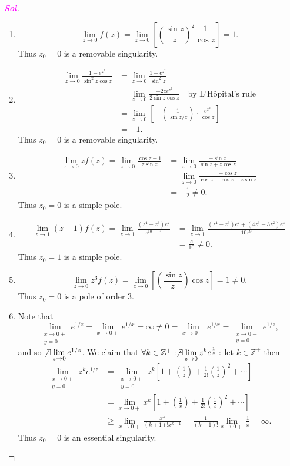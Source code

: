 \documentclass{article}
\theoremstyle{definition}
\newcommand{\Z}{\mathbb{Z}}
\newcommand{\of}[1]{\left( #1 \right)}
\newcommand{\sol}{\textcolor{magenta}{\bf Sol}}
\begin{document}
\begin{proof}[\sol]
	\begin{enumerate}[(1)]
		\item \[
		\lim\limits_{z\to 0}f(z)=\lim\limits_{z\to 0}\left[\of{\frac{\sin z}{z}}^2\frac{1}{\cos z}\right]=1.
		\] Thus $z_0=0$ is a removable singularity.
		\item \begin{align*}
			\lim\limits_{z\to 0}\frac{1-e^{z^2}}{\sin^2z\cos z}&=\lim\limits_{z\to 0}\frac{1-e^{z^2}}{\sin^2z}\\
			&=\lim\limits_{z\to 0}\frac{-2ze^{z^2}}{2\sin z\cos z}\quad\text{by L'Hôpital's rule}\\
			&=\lim\limits_{z\to 0}\left[-\of{\frac{1}{\sin z/z}}\cdot\frac{e^{z^2}}{\cos z}\right]\\
			&=-1.
		\end{align*}
		Thus $z_0=0$ is a removable singularity.
		\item \begin{align*}
			\lim\limits_{z\to 0}zf(z)=\lim\limits_{z\to 0}\frac{\cos z-1}{z\sin z}&=\lim\limits_{z\to 0}\frac{-\sin z}{\sin z+z\cos z}\\
			&=\lim\limits_{z\to 0}\frac{-\cos z}{\cos z+\cos z-z\sin z}\\
			&=-\frac{1}{2}\neq 0.
		\end{align*} Thus $z_0=0$ is a simple pole.
		\item \begin{align*}
			\lim\limits_{z\to 1}(z-1)f(z)=\lim\limits_{z\to 1}\frac{(z^4-z^3)e^z}{z^{10}-1}&=\lim\limits_{z\to 1}\frac{(z^4-z^3)e^z+(4z^3-3z^2)e^z}{10z^{9}}\\
			&=\frac{e}{10}\neq 0.
		\end{align*} Thus $z_0=1$ is a simple pole.
		\item \[
		\lim\limits_{z\to 0}z^3f(z)=\lim\limits_{z\to 0}\left[\of{\frac{\sin z}{z}}{\cos z}\right]=1\neq 0.
		\] Thus $z_0=0$ is a pole of order $3$.
		\item Note that \[
		\lim\limits_{\substack{x\to 0+\\ y=0}}e^{1/z}=\lim\limits_{x\to 0+}e^{1/x}=\infty\neq 0=\lim\limits_{x\to 0-}e^{1/x}=\lim\limits_{\substack{x\to 0-\\ y=0}}e^{1/z},
		\] and so $\not\exists\lim\limits_{z\to 0}e^{1/z}$. We claim that
		$\forall k\in\Z^+:\not\exists\lim\limits_{z\to 0} z^ke^{\frac{1}{z}}:$ let $k\in\Z^+$ then
		\begin{align*}
			\lim\limits_{\substack{x\to 0+\\ y=0}}z^ke^{1/z}&=\lim\limits_{\substack{x\to 0+\\ y=0}}z^k\left[1+\of{\frac{1}{z}}+\frac{1}{2!}\of{\frac{1}{z}}^2+\cdots\right]\\
			&=\lim\limits_{x\to 0+}x^k\left[1+\of{\frac{1}{x}}+\frac{1}{2!}\of{\frac{1}{x}}^2+\cdots\right]\\
			&\geq\lim\limits_{x\to 0+}\frac{x^k}{(k+1)!x^{k+1}}=\frac{1}{(k+1)!}\lim\limits_{x\to 0+}\frac{1}{x}=\infty.
		\end{align*} Thus $z_0=0$ is an essential singularity.
	\end{enumerate}
\end{proof}
\end{document}
